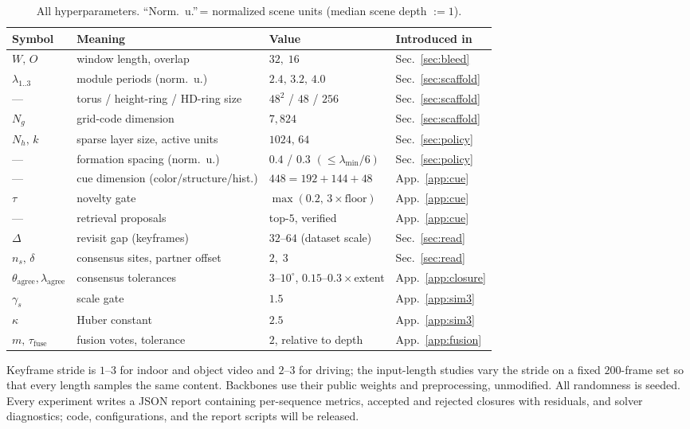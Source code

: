 \begin{table}[h]
\centering\small
\caption{All hyperparameters. ``Norm.\ u.''\,= normalized scene units
(median scene depth ${:=}1$).}
\label{tab:hparams}
\begin{tabular}{@{}llll@{}}
\toprule
Symbol & Meaning & Value & Introduced in \\
\midrule
$W,\,O$ & window length, overlap & $32,\;16$ & Sec.~\ref{sec:bleed} \\
$\lambda_{1..3}$ & module periods (norm.\ u.) & $2.4,\,3.2,\,4.0$ & Sec.~\ref{sec:scaffold} \\
--- & torus / height-ring / HD-ring size & $48^2$ / $48$ / $256$ & Sec.~\ref{sec:scaffold} \\
$N_g$ & grid-code dimension & $7{,}824$ & Sec.~\ref{sec:scaffold} \\
$N_h,\,k$ & sparse layer size, active units & $1024,\,64$ & Sec.~\ref{sec:policy} \\
--- & formation spacing (norm.\ u.) & $0.4$ / $0.3$ $(\le\lambda_{\min}/6)$ & Sec.~\ref{sec:policy} \\
--- & cue dimension (color/structure/hist.) & $448=192{+}144{+}48$ & App.~\ref{app:cue} \\
$\tau$ & novelty gate & $\max(0.2,\,3\times\text{floor})$ & App.~\ref{app:cue} \\
--- & retrieval proposals & top-$5$, verified & App.~\ref{app:cue} \\
$\Delta$ & revisit gap (keyframes) & $32$--$64$ (dataset scale) & Sec.~\ref{sec:read} \\
$n_s,\,\delta$ & consensus sites, partner offset & $2,\;3$ & Sec.~\ref{sec:read} \\
$\theta_{\text{agree}},\lambda_{\text{agree}}$ & consensus tolerances & $3$--$10^\circ$, $0.15$--$0.3\times$extent & App.~\ref{app:closure} \\
$\gamma_s$ & scale gate & $1.5$ & App.~\ref{app:sim3} \\
$\kappa$ & Huber constant & $2.5$ & App.~\ref{app:sim3} \\
$m,\,\tau_{\text{fuse}}$ & fusion votes, tolerance & $2$, relative to depth & App.~\ref{app:fusion} \\
\bottomrule
\end{tabular}
\end{table}

Keyframe stride is $1$--$3$ for indoor and object video and $2$--$3$ for
driving; the input-length studies vary the stride on a fixed $200$-frame
set so that every length samples the same content. Backbones use their
public weights and preprocessing, unmodified. All randomness is seeded.
Every experiment writes a JSON report containing per-sequence metrics,
accepted and rejected closures with residuals, and solver diagnostics;
code, configurations, and the report scripts will be released.

